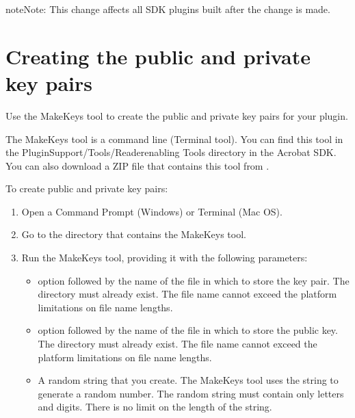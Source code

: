 \documentclass[letterpaper,12pt,english,openany,oneside]{sphinxmanual}
\begin{document}
\begin{sphinxadmonition}{note}{Note:}
This change affects all SDK plugins built after the change is made.
\end{sphinxadmonition}


\section{Creating the public and private key pairs}
\label{\detokenize{Plugins_ReaderPlug:creating-the-public-and-private-key-pairs}}
Use the MakeKeys tool to create the public and private key pairs for your plugin.

The MakeKeys tool is a command line (Terminal tool). You can find this tool in the PluginSupport/Tools/Reader\sphinxhyphen{}enabling Tools directory in the Acrobat SDK. You can also download a ZIP file that contains this tool from .

To create public and private key pairs:
\begin{enumerate}
%
\item {} 
Open a Command Prompt (Windows) or Terminal (Mac OS).

\item {} 
Go to the directory that contains the MakeKeys tool.

\item {} 
Run the MakeKeys tool, providing it with the following parameters:
\begin{itemize}
\item {} 
 option followed by the name of the file in which to store the key pair. The directory must already exist. The file name cannot exceed the platform limitations on file name lengths.

\item {} 
 option followed by the name of the file in which to store the public key. The directory must already exist. The file name cannot exceed the platform limitations on file name lengths.

\item {} 
A random string that you create. The MakeKeys tool uses the string to generate a random number. The random string must contain only letters and digits. There is no limit on the length of the string.

\end{itemize}

\end{enumerate}
\end{document}
